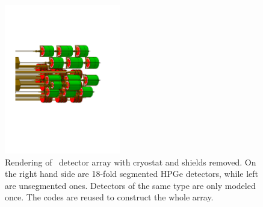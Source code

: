 \documentclass[article]{IEEEtran}
\begin{document}
\begin{figure}[tbh]
\centering
\includegraphics*[viewport=150 200 540 630,angle=270,width=0.45\textwidth]{plots/GerdaArray.pdf}
\caption{Rendering of \Gerda\ detector array with cryostat and shields
removed. On the right hand side are 18-fold segmented HPGe detectors,
while left are unsegmented ones. Detectors of the same type are only
modeled once. The codes are reused to construct the whole array.}
\label{fig:GerdaArray}
\end{figure}
\end{document}
